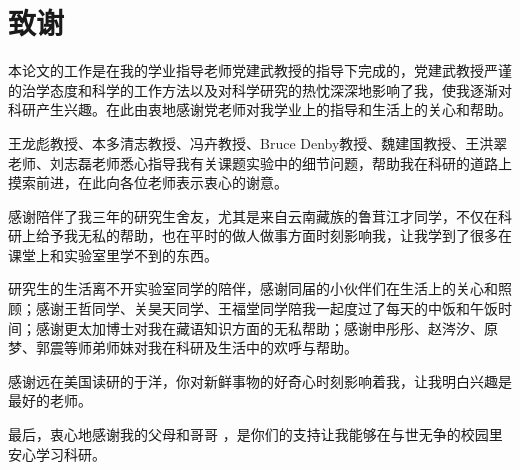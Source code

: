 
\chapter*{致\quad 谢}

\vspace*{1cm}
本论文的工作是在我的学业指导老师党建武教授的指导下完成的，党建武教授严谨的治学态度和科学的工作方法以及对科学研究的热忱深深地影响了我，使我逐渐对科研产生兴趣。在此由衷地感谢党老师对我学业上的指导和生活上的关心和帮助。

王龙彪教授、本多清志教授、冯卉教授、Bruce Denby教授、魏建国教授、王洪翠老师、刘志磊老师悉心指导我有关课题实验中的细节问题，帮助我在科研的道路上摸索前进，在此向各位老师表示衷心的谢意。

感谢陪伴了我三年的研究生舍友，尤其是来自云南藏族的鲁茸江才同学，不仅在科研上给予我无私的帮助，也在平时的做人做事方面时刻影响我，让我学到了很多在课堂上和实验室里学不到的东西。

研究生的生活离不开实验室同学的陪伴，感谢同届的小伙伴们在生活上的关心和照顾；感谢王哲同学、关昊天同学、王福堂同学陪我一起度过了每天的中饭和午饭时间；感谢更太加博士对我在藏语知识方面的无私帮助；感谢申彤彤、赵涔汐、原梦、郭震等师弟师妹对我在科研及生活中的欢呼与帮助。

感谢远在美国读研的于洋，你对新鲜事物的好奇心时刻影响着我，让我明白兴趣是最好的老师。

最后，衷心地感谢我的父母和哥哥 ，是你们的支持让我能够在与世无争的校园里安心学习科研。
